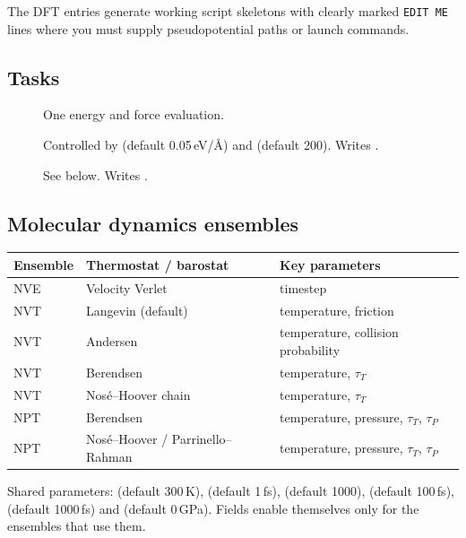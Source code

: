 The DFT entries generate working script skeletons with clearly marked
\texttt{EDIT ME} lines where you must supply pseudopotential paths or
launch commands.

\subsection{Tasks}

\begin{description}
  \item[] One energy and force evaluation.
  \item[] Controlled by
     (default 0.05\,eV/\AA) and
     (default 200). Writes .
  \item[] See below. Writes .
\end{description}

\subsection{Molecular dynamics ensembles}
\label{sec:md}

\begin{center}
\small
\begin{tabular}{@{}llp{5.6cm}@{}}
\toprule
Ensemble & Thermostat / barostat & Key parameters \\
\midrule
NVE  & Velocity Verlet                    & timestep \\
NVT  & Langevin (default)                 & temperature, friction \\
NVT  & Andersen                           & temperature, collision probability \\
NVT  & Berendsen                          & temperature, $\tau_T$ \\
NVT  & Nos\'e--Hoover chain               & temperature, $\tau_T$ \\
NPT  & Berendsen                          & temperature, pressure, $\tau_T$, $\tau_P$ \\
NPT  & Nos\'e--Hoover / Parrinello--Rahman & temperature, pressure, $\tau_T$, $\tau_P$ \\
\bottomrule
\end{tabular}
\end{center}

Shared parameters:  (default 300\,K), 
(default 1\,fs),  (default 1000),
 (default 100\,fs), 
(default 1000\,fs) and  (default 0\,GPa). Fields enable
themselves only for the ensembles that use them.

